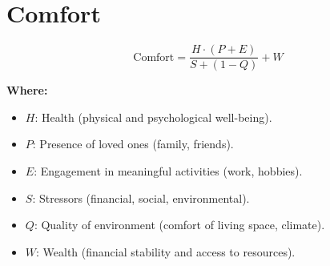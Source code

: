 \chapter{Comfort}

\begin{equation}
\text{Comfort} = \frac{H \cdot (P + E)}{S + (1 - Q)} + W
\end{equation}

\textbf{Where:}

\begin{itemize}
    \item $H$: Health (physical and psychological well-being).
    \item $P$: Presence of loved ones (family, friends).
    \item $E$: Engagement in meaningful activities (work, hobbies).
    \item $S$: Stressors (financial, social, environmental).
    \item $Q$: Quality of environment (comfort of living space, climate).
    \item $W$: Wealth (financial stability and access to resources).
\end{itemize}